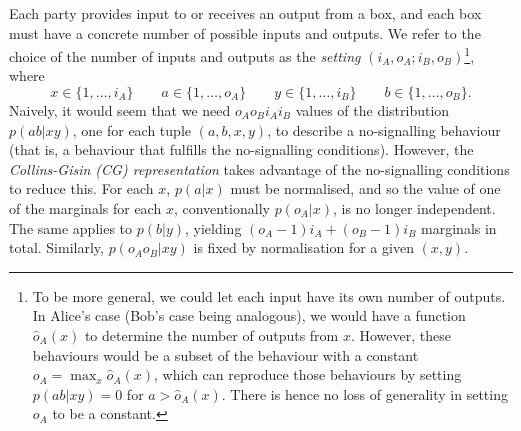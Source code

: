 \documentclass[10pt, a4paper]{article}
\numberwithin{equation}{section} %
\theoremstyle{definition}
\theoremstyle{plain}
\newcommand{\dintv}[2]{\mathopen\{#1,\ldots,#2\mathclose\}}
\newcommand{\?}{\mathrel{?}} %
\begin{document}
    Each party provides input to or receives an output from a box, and each box must have a concrete number of possible inputs and outputs. We refer to the choice of the number of inputs and outputs as the \emph{setting} \((i_A, o_A; i_B, o_B)\)\footnote{To be more general, we could let each input have its own number of outputs. In Alice's case (Bob's case being analogous), we would have a function \(\hat{o}_A(x)\) to determine the number of outputs from \(x\). However, these behaviours would be a subset of the behaviour with a constant \(o_A = \max_x \hat{o}_A(x)\), which can reproduce those behaviours by setting \(p(ab|xy) = 0\) for \(a > \hat{o}_A(x)\). There is hence no loss of generality in setting \(o_A\) to be a constant.}, where
    \[ x \in \dintv{1}{i_A} \qquad a \in \dintv{1}{o_A} \qquad y \in \dintv{1}{i_B} \qquad b \in \dintv{1}{o_B}. \]
    Naively, it would seem that we need \(o_A o_B i_A i_B\) values of the distribution \(p(ab|xy)\), one for each tuple \((a, b, x, y)\), to describe a no-signalling behaviour (that is, a behaviour that fulfills the no-signalling conditions). However, the \emph{Collins-Gisin (CG) representation} takes advantage of the no-signalling conditions to reduce this. For each \(x\), \(p(a|x)\) must be normalised, and so the value of one of the marginals for each \(x\), conventionally \(p(o_A|x)\), is no longer independent. The same applies to \(p(b|y)\), yielding \((o_A-1)i_A + (o_B-1)i_B\) marginals in total. Similarly, \(p(o_A o_B|xy)\) is fixed by normalisation for a given \((x,y)\).
\end{document}

